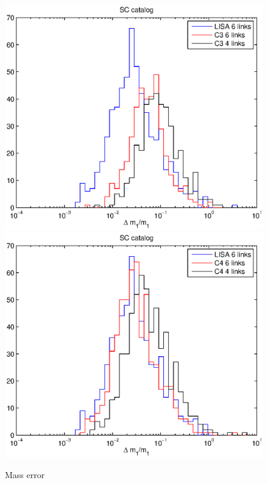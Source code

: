 \documentclass{iopart}
\begin{document}
\begin{figure}[H]
\includegraphics[scale=0.54]{FigSMBHRyanNeil/SCm13.eps}
\includegraphics[scale=0.54]{FigSMBHRyanNeil/SCm14.eps}
\caption{Mass error}
\end{figure}
\end{document}
